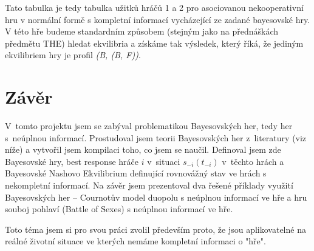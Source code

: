 \documentclass[12pt,a4paper,titlepage,final]{article}
\begin{document}
Tato tabulka je tedy tabulka užitků hráčů 1 a 2 pro asociovanou nekooperativní hru v normální formě s kompletní informací vycházející ze zadané bayesovské hry.
V této hře budeme standardním způsobem (stejným jako na přednáškách předmětu THE) hledat ekvilibria a získáme tak výsledek, který říká, že jediným ekvilibriem hry je profil \emph{(B, (B, F))}.

\newpage

\section{Závěr} \label{zaver}
V~tomto projektu jsem se zabýval problematikou Bayesovských her, tedy her s~neúplnou informací.
Prostudoval jsem teorii Bayesovských her z~literatury (viz níže) a vytvořil jsem kompilaci toho, co jsem se naučil.
Definoval jsem zde Bayesovské hry, best response hráče $i$ v~situaci $s_{-i}(t_{-i})$  v~těchto hrách a Bayesovské Nashovo Ekvilibrium definující rovnovážný stav ve hrách s nekompletní informací.
Na závěr jsem prezentoval dva řešené příklady využití Bayesovských her -- Cournotův model duopolu s neúplnou informací ve hře a hru souboj pohlaví (Battle of Sexes) s neúplnou informací ve hře.

Toto téma jsem si pro svou práci zvolil především proto, že jsou aplikovatelné na reálné životní situace ve kterých nemáme kompletní informaci o "hře".

\nocite{bgames}
\nocite{bgames-hyksova}
\nocite{bgames-ratliff}
\nocite{bgames-chen}
\nocite{bgames-ozdaglar}
\nocite{bgames-ordonez}

\newpage


\end{document}
